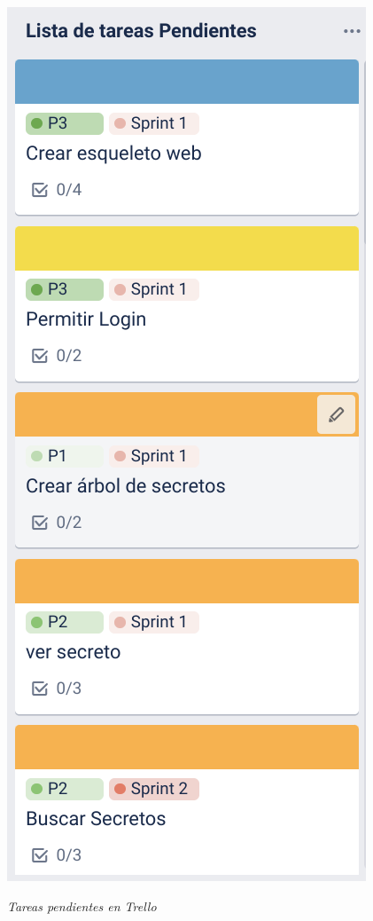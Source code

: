 \documentclass{\ClassPath/viu-tfm-template}
\begin{document}
\begin{minipage}{0.29\linewidth}
    \includegraphics[width=\linewidth]{img/tareas.png}
    \vspace{-35pt}
    \begin{center}
        {\scriptsize \textit{Tareas pendientes en Trello}}
    \end{center}
\end{minipage}
\end{document}
